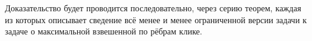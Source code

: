 \documentclass{article}
\begin{document}
Доказательство будет проводится последовательно, через серию теорем, каждая из которых описывает сведение всё менее и менее ограниченной версии задачи к задаче о максимальной взвешенной по рёбрам клике.



%
%
%
\end{document}
